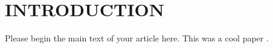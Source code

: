 \section{INTRODUCTION}

Please begin the main text of your article here. This was a cool paper \cite{computational2016computational}.

